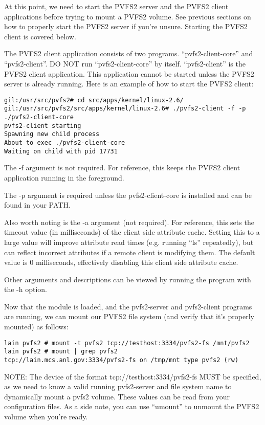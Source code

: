 \documentclass[11pt, letterpaper]{article}
\begin{document}
At this point, we need to start the PVFS2 server and the PVFS2 client
applications before trying to mount a PVFS2 volume.  See previous
sections on how to properly start the PVFS2 server if you're unsure.
Starting the PVFS2 client is covered below.

The PVFS2 client application consists of two programs.
``pvfs2-client-core'' and ``pvfs2-client''.  DO NOT run
``pvfs2-client-core'' by itself.  ``pvfs2-client'' is the PVFS2 client
application.  This application cannot be started unless the PVFS2
server is already running.  Here is an example of how to start the
PVFS2 client:

\begin{verbatim}
gil:/usr/src/pvfs2# cd src/apps/kernel/linux-2.6/
gil:/usr/src/pvfs2/src/apps/kernel/linux-2.6# ./pvfs2-client -f -p ./pvfs2-client-core
pvfs2-client starting
Spawning new child process
About to exec ./pvfs2-client-core
Waiting on child with pid 17731
\end{verbatim}

The -f argument is not required.  For reference, this keeps the PVFS2
client application running in the foreground.

The -p argument is required unless the pvfs2-client-core is installed
and can be found in your PATH.

Also worth noting is the -a argument (not required).  For reference,
this sets the timeout value (in milliseconds) of the client side
attribute cache.  Setting this to a large value will improve attribute
read times (e.g. running ``ls'' repeatedly), but can reflect incorrect
attributes if a remote client is modifying them.  The default value is
0 milliseconds, effectively disabling this client side attribute
cache.

Other arguments and descriptions can be viewed by running the program
with the -h option.

Now that the module is loaded, and the pvfs2-server and pvfs2-client
programs are running, we can mount our PVFS2 file system (and verify
that it's properly mounted) as follows:

\begin{verbatim}
lain pvfs2 # mount -t pvfs2 tcp://testhost:3334/pvfs2-fs /mnt/pvfs2
lain pvfs2 # mount | grep pvfs2
tcp://lain.mcs.anl.gov:3334/pvfs2-fs on /tmp/mnt type pvfs2 (rw)
\end{verbatim}

NOTE: The device of the format tcp://testhost:3334/pvfs2-fs MUST be
specified, as we need to know a valid running pvfs2-server and file
system name to dynamically mount a pvfs2 volume.  These values can be
read from your configuration files.  As a side note, you can use
``umount'' to unmount the PVFS2 volume when you're ready.
\end{document}

